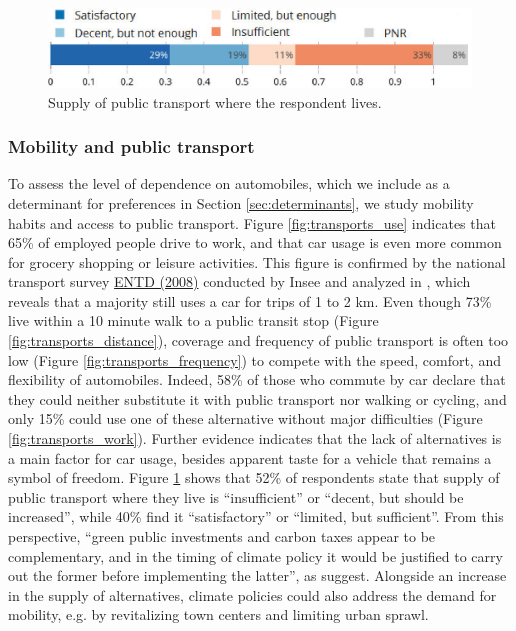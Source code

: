 \documentclass[english,5p,authoryear]{elsarticle}
\begin{document}
\begin{figure}[b]
\centering
\includegraphics[width=\columnwidth]{Images_EPS/transports_opinion_trim.eps}
\caption{Supply of public transport where the respondent lives.}
\label{fig:transports_opinion}
\end{figure}

    \subsubsection{Mobility and public transport}

To assess the level of dependence on automobiles, which we include as a determinant for preferences in Section \ref{sec:determinants}, we study mobility habits and access to public transport. Figure \ref{fig:transports_use} indicates that 65\% of employed people drive to work, and that car usage is even more common for grocery shopping or leisure activities. This figure is confirmed by the national transport survey \href{http://www.progedo-adisp.fr/enquetes/XML/lil-0634.xml}{ENTD (2008)} conducted by Insee and analyzed in \cite{pappalardo_mobilite_2010}, which reveals that a majority still uses a car for trips of 1 to 2 km. Even though 73\% live within a 10 minute walk to a public transit stop (Figure \ref{fig:transports_distance}), coverage and frequency of public transport is often too low (Figure \ref{fig:transports_frequency}) to compete with the speed, comfort, and flexibility of automobiles. Indeed, 58\% of those who commute by car declare that they could neither substitute it with public transport nor walking or cycling, and only 15\% could use one of these alternative without major difficulties (Figure \ref{fig:transports_work}). Further evidence indicates that the lack of alternatives is a main factor for car usage, besides apparent taste for a vehicle that remains a symbol of freedom. Figure \ref{fig:transports_opinion} shows that 52\% of respondents state that supply of public transport where they live is ``insufficient'' or ``decent, but should be increased'', while 40\% find it ``satisfactory'' or ``limited, but sufficient''. From this perspective, ``green public investments and carbon taxes appear to be complementary, and in the timing of climate policy it would be justified to carry out the former before implementing the latter'', as \cite{bureau_pour_2019} suggest. Alongside an increase in the supply of alternatives, climate policies could also address the demand for mobility, e.g. by revitalizing town centers and limiting urban sprawl.
\end{document}
